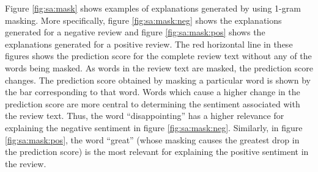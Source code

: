 Figure \ref{fig:sa:mask} shows examples of explanations generated by using 1-gram masking. More specifically, figure \ref{fig:sa:mask:neg} shows the explanations generated for a negative review and figure \ref{fig:sa:mask:pos} shows the explanations generated for a positive review. The red horizontal line in these figures shows the prediction score for the complete review text without any of the words being masked. As words in the review text are masked, the prediction score changes. The prediction score obtained by masking a particular word is shown by the bar corresponding to that word. Words which cause a higher change in the prediction score are more central to determining the sentiment associated with the review text. Thus, the word ``disappointing'' has a higher relevance for explaining the negative sentiment in figure \ref{fig:sa:mask:neg}. Similarly, in figure \ref{fig:sa:mask:pos}, the word ``great'' (whose masking causes the greatest drop in the prediction score) is the most relevant for explaining the positive sentiment in the review. 


